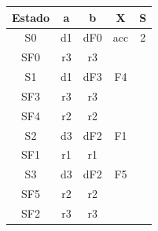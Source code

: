 \documentclass[nochap]{apuntes}
\begin{document}
\begin{problem}
\ppart
\begin{tabular}{| c | c | c | c | c | }
\hline
Estado  & a & b & X & S \\
\hline
S0 & d1 & dF0 & acc & 2\\
\hline
SF0 & r3  & r3 &  & \\
\hline
S1 & d1 & dF3 & F4 &  \\
\hline
SF3 & r3 & r3 &  & \\
\hline
SF4 & r2 & r2 &  &   \\
\hline
S2 & d3 & dF2 & F1 &  \\
\hline
SF1 & r1 & r1 &  &  \\
\hline
S3 & d3 & dF2 & F5 & \\
\hline
SF5 & r2 & r2 &  &  \\
\hline
SF2 & r3 & r3 &  &  \\
\hline
\end{tabular}


\end{problem}
\end{document}
